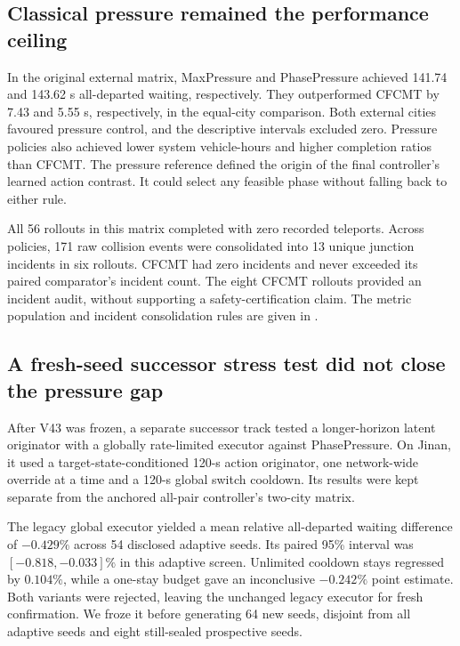 \subsection{Classical pressure remained the performance ceiling}

In the original external matrix, MaxPressure and PhasePressure achieved
141.74 and 143.62 s all-departed waiting, respectively.  They outperformed
CFCMT by 7.43 and 5.55 s, respectively, in the equal-city comparison.  Both
external cities favoured pressure control, and the descriptive intervals
excluded zero.  Pressure policies also achieved lower system vehicle-hours
and higher completion ratios than CFCMT.  The pressure reference defined the
origin of the final controller's learned action contrast.  It could select
any feasible phase without falling back to either rule.

All 56 rollouts in this matrix completed with zero recorded teleports.
Across policies, 171 raw collision events were consolidated into 13 unique
junction incidents in six rollouts.  CFCMT had zero incidents and never
exceeded its paired comparator's incident count.  The eight CFCMT rollouts
provided an incident audit, without supporting a safety-certification claim.
The metric population and incident consolidation rules are given in
.

\subsection{A fresh-seed successor stress test did not close the pressure gap}

After V43 was frozen, a separate successor track tested a longer-horizon
latent originator with a globally rate-limited executor against PhasePressure.
On Jinan, it used a target-state-conditioned 120-s action originator, one
network-wide override at a time and a 120-s global switch cooldown.  Its results
were kept separate from the anchored all-pair controller's two-city matrix.

The legacy global executor yielded a mean relative all-departed waiting
difference of $-0.429\%$ across 54 disclosed adaptive seeds.  Its paired 95\%
interval was $[-0.818,-0.033]\%$ in this adaptive screen.  Unlimited cooldown
stays regressed by $0.104\%$, while a one-stay budget gave an inconclusive
$-0.242\%$ point estimate.  Both variants were rejected, leaving the unchanged
legacy executor for fresh confirmation.  We froze it before generating 64
new seeds, disjoint from all adaptive seeds and eight still-sealed prospective
seeds.

